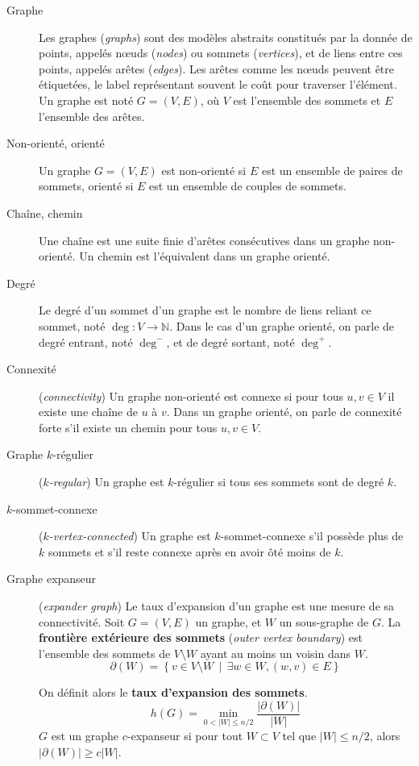 \documentclass[12pt,a4paper]{article}
\begin{document}
\begin{description}
\item[Graphe] Les graphes (\textit{graphs}) sont des modèles abstraits
  constitués par la donnée de points, appelés nœuds (\textit{nodes})
  ou sommets (\textit{vertices}), et de liens entre ces points,
  appelés arêtes (\textit{edges}). Les arêtes comme les nœuds peuvent
  être étiquetées, le label représentant souvent le coût pour
  traverser l'élément. Un graphe est noté \(G = (V, E)\), où \(V\)
  est l'ensemble des sommets et \(E\) l'ensemble des arêtes.
\item[Non-orienté, orienté] Un graphe \(G = (V, E)\) est non-orienté si
  \(E\) est un ensemble de paires de sommets, orienté si \(E\) est un
  ensemble de couples de sommets.
\item[Chaîne, chemin] Une chaîne est une suite finie d'arêtes
  consécutives dans un graphe non-orienté. Un chemin est l'équivalent
  dans un graphe orienté.
\item[Degré] Le degré d'un sommet d'un graphe est le nombre de liens
  reliant ce sommet, noté \(\deg : V \to \mathbb{N}\). Dans le cas
  d'un graphe orienté, on parle de degré entrant, noté \(\deg^-\), et
  de degré sortant, noté \(\deg^+\).
\item[Connexité] (\textit{connectivity}) Un graphe non-orienté est
  connexe si pour tous \(u, v \in V\) il existe une chaîne de \(u\) à
  \(v\). Dans un graphe orienté, on parle de connexité forte s'il
  existe un chemin pour tous \(u, v \in V\).
\item[Graphe \(k\)-régulier] (\textit{\(k\)-regular}) Un graphe est
  \(k\)-régulier si tous ses sommets sont de degré \(k\).
\item[\(k\)-sommet-connexe] (\textit{\(k\)-vertex-connected}) Un
  graphe est \(k\)-sommet-connexe s'il possède plus de \(k\) sommets
  et s'il reste connexe après en avoir ôté moins de \(k\).
\item[Graphe expanseur] (\textit{expander graph}) Le taux d'expansion
  d'un graphe est une mesure de sa connectivité. Soit \(G = (V, E)\)
  un graphe, et \(W\) un sous-graphe de \(G\). La \textbf{frontière
    extérieure des sommets} (\textit{outer vertex boundary}) est
  l'ensemble des sommets de \(V \setminus W\) ayant au moins un voisin
  dans \(W\).
  \[\partial(W) = \left\{v \in V \setminus W \,\middle|\, \exists w
      \in W, (w, v) \in E\right\}\]

  On définit alors le \textbf{taux d'expansion des sommets}.
  \[h(G) = \min_{0 < |W| \leq n/2}\frac{|\partial(W)|}{|W|}\]
  \(G\) est un graphe \(c\)-expanseur si pour tout \(W \subset V\) tel
  que \(|W| \leq n / 2\), alors \(|\partial(W)| \geq c |W|\).
\end{description}
\end{document}
